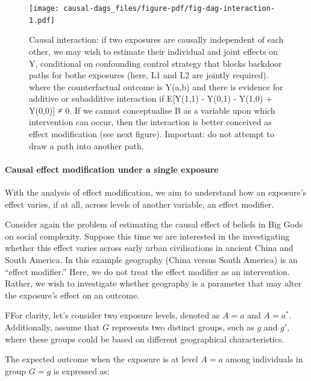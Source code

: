 \documentclass[
  singlecolumn,
  9pt]{article}
\let\oldparagraph\paragraph
\renewcommand{\paragraph}[1]{\oldparagraph{#1}\mbox{}}
\begin{document}
\begin{figure}

{\centering \texttt{[image: causal-dags\_files/figure-pdf/fig-dag-interaction-1.pdf]}

}

\caption{\label{fig-dag-interaction}Causal interaction: if two exposures
are causally independent of each other, we may wish to estimate their
individual and joint effects on Y, conditional on confounding control
strategy that blocks backdoor paths for bothe exposures (here, L1 and L2
are jointly required). where the counterfactual outcome is Y(a,b) and
there is evidence for additive or subadditive interaction if E{[}Y(1,1)
- Y(0,1) - Y(1,0) + Y(0,0){]} ≠ 0. If we cannot conceptualise B as a
variable upon which intervention can occur, then the interaction is
better conceived as effect modification (see next figure). Important: do
not attempt to draw a path into another path.}

\end{figure}

\paragraph{\texorpdfstring{\textbf{Causal effect modification under a
single
exposure}}{Causal effect modification under a single exposure}}\label{causal-effect-modification-under-a-single-exposure}

With the analysis of effect modification, we aim to understand how an
exposure's effect varies, if at all, across levels of another variable,
an effect modifier.

Consider again the problem of estimating the causal effect of beliefs in
Big Gods on social complexity. Suppose this time we are interested in
the investigating whether this effect varies across early urban
civilisations in ancient China and South America. In this example
geography (China versus South America) is an ``effect modifier.'' Here,
we do not treat the effect modifier as an intervention. Rather, we wish
to investigate whether geography is a parameter that may alter the
exposure's effect on an outcome.

FFor clarity, let's consider two exposure levels, denoted as \(A = a\)
and \(A = a^*\). Additionally, assume that \(G\) represents two distinct
groups, such as \(g\) and \(g'\), where these groups could be based on
different geographical characteristics.

The expected outcome when the exposure is at level \(A = a\) among
individuals in group \(G = g\) is expressed as:
\end{document}
